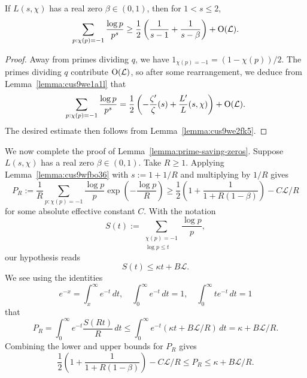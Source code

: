 \documentclass[reqno]{amsart} 
\begin{document}
\begin{lemma}\label{lemma:cus9wfbo36}
  If $L(s, \chi)$ has a real zero $\beta \in (0, 1)$, then for $1 < s \leq 2$,
  \begin{equation*}
    \sum_{p : \chi(p) = - 1}\frac{\log p}{p^s}
    \geq
    \frac{1}{2} \left(
      \frac{1}{s - 1} + \frac{1}{s - \beta}
    \right)
    + \operatorname{O}(\mathcal{L}).
  \end{equation*}
\end{lemma}
\begin{proof}
  Away from primes dividing $q$, we have $1_{\chi(p)=-1}=(1-\chi(p))/2$.  The primes dividing $q$ contribute $\operatorname{O}(\mathcal L)$, so after some rearrangement, we deduce from Lemma~\ref{lemma:cus9we1a1l} that
  \begin{equation*}
    \sum_{p : \chi(p) = - 1}\frac{\log p}{p^s}
    =
    \frac{1}{2} \left(
      - \frac{\zeta '}{\zeta}(s) + \frac{L'}{L}(s, \chi)
    \right)
    + \operatorname{O}(\mathcal{L}).
  \end{equation*}
  The desired estimate then follows from Lemma~\ref{lemma:cus9we2fk5}.
\end{proof}

We now complete the proof of Lemma~\ref{lemma:prime-saving-zeros}.  Suppose \(L(s,\chi)\) has a real zero \(\beta\in(0,1)\).  Take $R \geq 1$.  Applying Lemma~\ref{lemma:cus9wfbo36} with $s := 1 + 1/R$ and multiplying by $1/R$ gives
\begin{equation*}
  P_R := \frac{1}{R} \sum_{p:\chi (p) = - 1} \frac{\log p}{p}
  \exp \left( {- \frac{\log p}{R}} \right)
  \geq \frac{1}{2} \left( 1 + \frac{1}{1 + R(1 - \beta)} \right) - C \mathcal{L} / R
\end{equation*}
for some absolute effective constant $C$.  With the notation
\begin{equation*}
  S(t):=\sum_{\substack{\chi(p)=-1\\\log p\le t}}\frac{\log p}{p},
\end{equation*}
our hypothesis reads
\begin{equation*}
  S(t) \leq \kappa t + B \mathcal{L}.
\end{equation*}
We see using the identities
\begin{equation*}
  e^{- x} = \int_{x}^\infty e^{- t} \, d t, \quad 
  \int_0^\infty e^{- t} \, d t = 1, \quad 
  \int_0^\infty t e^{- t} \, d t = 1
\end{equation*}
that
\begin{equation*}
  P_R = \int_{0}^\infty e^{-t} \frac{S(R t)}{R} \, d t
  \leq
  \int_{0}^\infty e^{-t} \left( \kappa t + B \mathcal{L} / R \right) \, d t
  = \kappa + B \mathcal{L} / R.
\end{equation*}
Combining the lower and upper bounds for $P_R$ gives
\begin{equation}\label{eq:cus9wa0jyo}
  \frac{1}{2} \left( 1 + \frac{1}{1 + R(1 - \beta)} \right) - C \mathcal{L} / R
  \leq
  P_R
  \leq
  \kappa + B \mathcal{L} / R.
\end{equation}
\end{document}
